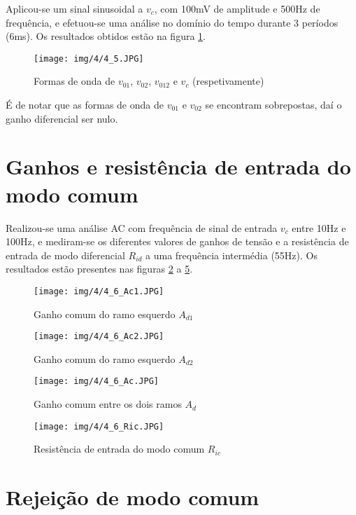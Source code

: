 \documentclass[a4paper,2pt]{report}
\begin{document}
\par Aplicou-se um sinal sinusoidal a \(v_c\), com 100mV de amplitude e 500Hz de frequência, e efetuou-se uma análise no domínio do tempo durante 3 períodos (6ms). Os resultados obtidos estão na figura \ref{4_5}.

\begin{figure}[H]
    \centering
    \texttt{[image: img/4/4\_5.JPG]}
    \caption{Formas de onda de \(v_{01}\), \(v_{02}\), \(v_{012}\) e \(v_{c}\) (respetivamente)}
    \label{4_5}
\end{figure}

\par É de notar que as formas de onda de \(v_{01}\) e \(v_{02}\) se encontram sobrepostas, daí o ganho diferencial ser nulo.

\section{Ganhos e resistência de entrada do modo comum}

\par Realizou-se uma análise AC com frequência de sinal de entrada \(v_c\) entre 10Hz e 100Hz, e mediram-se os diferentes valores de ganhos de tensão e a resistência de entrada de modo diferencial \(R_{id}\) a uma frequência intermédia (55Hz). Os resultados estão presentes nas figuras \ref{4_6_ad1} a \ref{4_6_rid}.

\begin{figure}[H]
    \centering
    \texttt{[image: img/4/4\_6\_Ac1.JPG]}
    \caption{Ganho comum do ramo esquerdo \(A_{d1}\)}
    \label{4_6_ad1}
\end{figure}
\begin{figure}[H]
    \centering
    \texttt{[image: img/4/4\_6\_Ac2.JPG]}
    \caption{Ganho comum do ramo esquerdo \(A_{d2}\)}
    \label{4_6_ad2}
\end{figure}
\begin{figure}[H]
    \centering
    \texttt{[image: img/4/4\_6\_Ac.JPG]}
    \caption{Ganho comum entre os dois ramos \(A_d\)}
    \label{4_6_ad}
\end{figure}
\begin{figure}[H]
    \centering
    \texttt{[image: img/4/4\_6\_Ric.JPG]}
    \caption{Resistência de entrada do modo comum \(R_{ic}\)}
    \label{4_6_rid}
\end{figure}

\section{Rejeição de modo comum}
\end{document}
